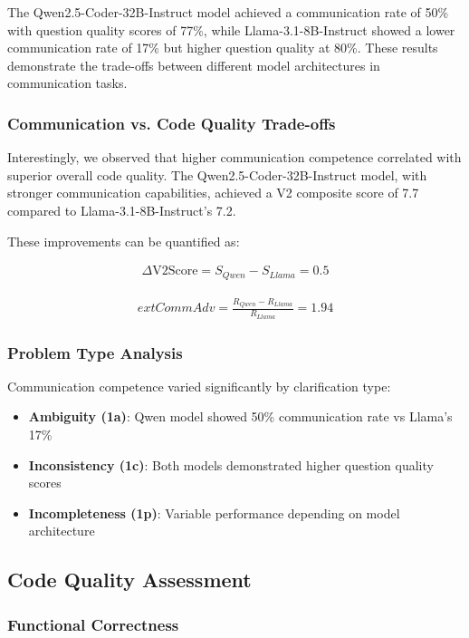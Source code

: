 \documentclass[conference]{IEEEtran}
\begin{document}
The Qwen2.5-Coder-32B-Instruct model achieved a communication rate of 50\% with question quality scores of 77\%, while Llama-3.1-8B-Instruct showed a lower communication rate of 17\% but higher question quality at 80\%. These results demonstrate the trade-offs between different model architectures in communication tasks.

\subsubsection{Communication vs. Code Quality Trade-offs}

Interestingly, we observed that higher communication competence correlated with superior overall code quality. The Qwen2.5-Coder-32B-Instruct model, with stronger communication capabilities, achieved a V2 composite score of 7.7 compared to Llama-3.1-8B-Instruct's 7.2.

These improvements can be quantified as:

\begin{align}
\Delta \text{V2Score} = S_{Qwen} - S_{Llama} = 0.5
\end{align}

\begin{align}
    	ext{CommAdv} = \frac{R_{Qwen} - R_{Llama}}{R_{Llama}} = 1.94
\end{align}

\subsubsection{Problem Type Analysis}

Communication competence varied significantly by clarification type:

\begin{itemize}
    \item \textbf{Ambiguity (1a)}: Qwen model showed 50\% communication rate vs Llama's 17\%
    \item \textbf{Inconsistency (1c)}: Both models demonstrated higher question quality scores
    \item \textbf{Incompleteness (1p)}: Variable performance depending on model architecture
\end{itemize}

\subsection{Code Quality Assessment}

\subsubsection{Functional Correctness}
\end{document}

